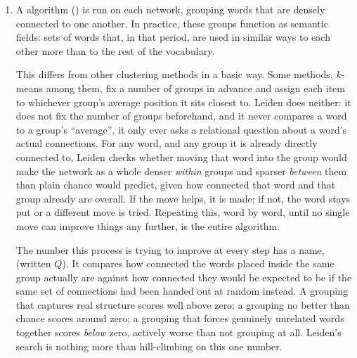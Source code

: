 \documentclass[11pt]{article}
\begin{document}
\begin{enumerate}
    A fixed, hand-curated list of about ninety common function words -
    articles, prepositions, conjunctions, the standard pronoun forms,
    auxiliary verbs, plus early-modern spelling variants (\emph{hath},
    \emph{doth}, \emph{thou}, \emph{ye}, \emph{unto}) that EEBO/ECCO/Evans
    spelling keeps unmodernized - is excluded from the network as nodes,
    along with every single-letter token (always either one of these
    words, a Latin citation abbreviation, or an OCR artifact).

    These words still take part in training, where they help place every
    other word's meaning correctly; they are left out only at this
    network-building stage, since the interest here is in words that
    carry conceptual content. The exclusion is this specific list, not a
    part-of-speech rule - it does not remove every pronoun as a
    grammatical category, only the particular forms named above.

  \item {} A 
    algorithm () is run on each network, grouping words
    that are densely connected to one another. In practice, these groups
    function as semantic fields: sets of words that, in that period, are
    used in similar ways to each other more than to the rest of the
    vocabulary.

    This differs from other clustering methods in a basic way. Some
    methods, $k$-means among them, fix a number of groups in advance and
    assign each item to whichever group's average position it sits
    closest to. Leiden does neither: it does not fix the number of groups beforehand,
    and it never compares a word to a group's ``average'', it only ever
    asks a relational question about a word's actual connections. For any
    word, and any group it is already directly connected to, Leiden checks
    whether moving that word into the group would make the network as a
    whole denser \emph{within} groups and sparser \emph{between} them than
    plain chance would predict, given how connected that word and that
    group already are overall. If the move helps, it is made; if not, the
    word stays put or a different move is tried. Repeating this, word by
    word, until no single move can improve things any further, is the
    entire algorithm.

    The number this process is trying to improve at every step has a name,
     (written $Q$). It compares how connected the words
    placed inside the same group actually are against how connected they
    would be expected to be if the same set of connections had been handed
    out at random instead. A grouping that captures real structure scores
    well above zero; a grouping no better than chance scores around zero;
    a grouping that forces genuinely unrelated words together scores
    \emph{below} zero, actively worse than not grouping at all. Leiden's
    search is nothing more than hill-climbing on this one number.


\end{enumerate}
\end{document}
